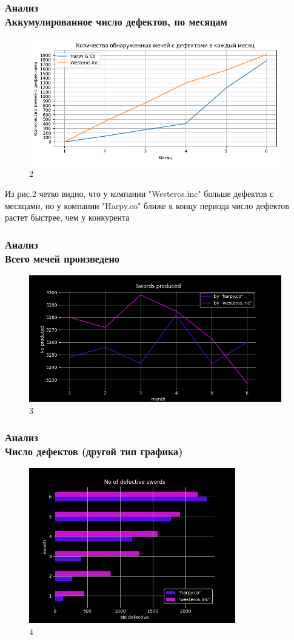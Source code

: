\documentclass[8pt]{beamer}
\begin{document}
\begin{frame}
\frametitle{Анализ\\{\small Аккумулированное число дефектов, по месяцам}}
\begin{figure}[h]
		\includegraphics[width=110mm]{4-before-last.png}
		\caption{2}
		\label{Second}
\end{figure}
\end{frame}
\begin{frame}
Из рис.2 четко видно, что у компании "Westeros.inc" больше дефектов с месяцами, но у компании "Harpy.co" ближе к концу периода число дефектов растет быстрее, чем у конкурента
\end{frame}

\begin{frame}
\frametitle{Анализ\\ {\small Всего мечей произведено}}
\begin{figure}[h]
		\includegraphics[width=110mm]{3-before-last.png}
		\caption{3}
		\label{Third}
\end{figure}
\end{frame}

\begin{frame}
\frametitle{Анализ\\ {\small Число дефектов (другой тип графика)}}
\begin{figure}[h]
		\includegraphics[width=90mm]{2-before-last.png}
		\caption{4}
		\label{Fourth}
\end{figure}
\end{frame}
\end{document}
